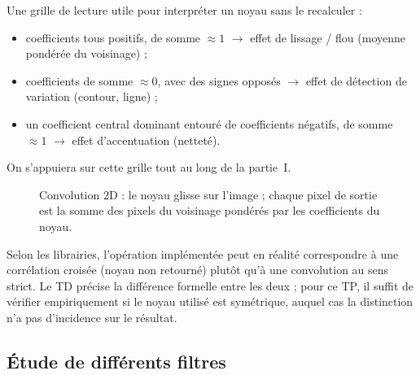 Une grille de lecture utile pour interpréter un noyau sans le recalculer :
\begin{itemize}
    \item coefficients tous positifs, de somme $\approx 1$ $\rightarrow$ effet de lissage / flou (moyenne pondérée du voisinage) ;
    \item coefficients de somme $\approx 0$, avec des signes opposés $\rightarrow$ effet de détection de variation (contour, ligne) ;
    \item un coefficient central dominant entouré de coefficients négatifs, de somme $\approx 1$ $\rightarrow$ effet d'accentuation (netteté).
\end{itemize}

On s'appuiera sur cette grille tout au long de la partie~I. \\

\begin{figure}[H]
\centering
\resizebox{0.7\linewidth}{!}{}
\caption{Convolution 2D : le noyau glisse sur l'image ; chaque pixel de sortie est la somme des pixels du voisinage pondérés par les coefficients du noyau.}
\label{fig:tp2-conv}
\end{figure}

% 



\begin{imp}
Selon les librairies, l'opération implémentée peut en réalité correspondre à une corrélation croisée (noyau non retourné) plutôt qu'à une convolution au sens strict. Le TD précise la différence formelle entre les deux ; pour ce TP, il suffit de vérifier empiriquement si le noyau utilisé est symétrique, auquel cas la distinction n'a pas d'incidence sur le résultat.
\end{imp}

\subsection{Étude de différents filtres}

